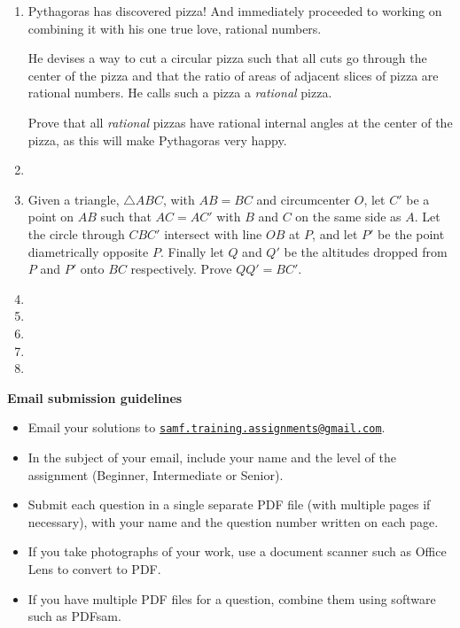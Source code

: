 \documentclass{article}
\begin{document}
\begin{enumerate}

\medskip
\item %
Pythagoras has discovered pizza! And immediately proceeded to working on combining it with his one true love, rational numbers.

He devises a way to cut a circular pizza such that all cuts go through the center of the pizza and that the ratio of areas of adjacent slices of pizza are rational numbers. He calls such a pizza a \textit{rational} pizza.

Prove that all \textit{rational} pizzas have rational internal angles at the center of the pizza, as this will make Pythagoras very happy.

\medskip
\item  %

\medskip
\item %
Given a triangle, $\triangle ABC$, with $AB = BC$ and circumcenter $O$, let $C'$ be a point on $AB$ such that $AC = AC'$ with $B$ and $C$ on the same side as $A$. Let the circle through $CBC'$ intersect with line $OB$ at $P$, and let $P'$ be the point diametrically opposite $P$. Finally let $Q$ and $Q'$ be the altitudes dropped from $P$ and $P'$ onto $BC$ respectively. Prove $QQ' = BC'$.

\medskip
\item %

\medskip
\item %

\medskip
\item %

\medskip
\item %

\medskip
\item %
\end{enumerate}


\vfill
\textbf{\Large Email submission guidelines}
\begin{itemize}
	\item Email your solutions to \href{mailto:samf.training.assignments@gmail.com}{\texttt{samf.training.assignments@gmail.com}}.
	\item In the subject of your email, include your name and the level of the assignment (Beginner, Intermediate or Senior).
	\item Submit each question in a single separate PDF file (with multiple pages if necessary), with your name and the question number written on each page.
	\item If you take photographs of your work, use a document scanner such as Office Lens to convert to PDF.
	\item If you have multiple PDF files for a question, combine them using software such as PDFsam.
\end{itemize}
\end{document}
